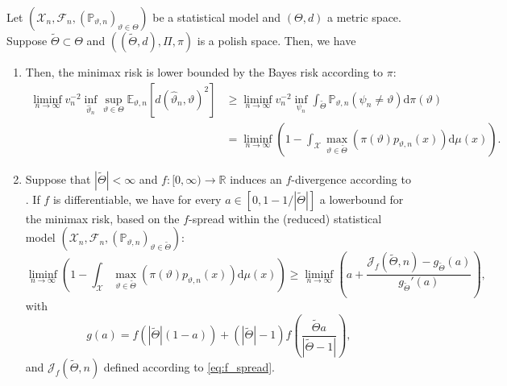 \documentclass[a4paper]{article}
\begin{document}
\begin{proposition}
	Let $(\mathcal{X}_n, \mathcal{F}_n, (\mathbb{P}_{\vartheta,n})_{\vartheta \in \Theta})$ be a statistical model and $(\Theta,d)$ a metric space. Suppose $\tilde{\Theta}\subset \Theta$ and $((\tilde{\Theta},d), \Pi, \pi)$ is a polish space. Then, we have
	\begin{enumerate}
		\item Then, the minimax risk is lower bounded by the Bayes risk according to $\pi$:
		      \begin{equation*}
			      \begin{aligned}
				      \liminf_{n \rightarrow \infty} v_n^{-2} \inf_{\hat{\vartheta}_n} \sup_{\vartheta \in \Theta} \mathbb{E}_{\vartheta,n}[d(\hat{\vartheta}_{n}, \vartheta)^{2}] & \geq \liminf_{n \rightarrow \infty} v_n^{-2} \inf_{\psi_n} \int_{\tilde{\Theta}} \mathbb{P}_{\vartheta, n}(\psi_n \neq \vartheta) \mathrm{d}\pi(\vartheta) \\
				                                                                                                                                                                   & =\liminf_{n \rightarrow \infty} \left(1-\int_{\mathcal{X}}\max_{\vartheta \in \tilde{\Theta}} (\pi(\vartheta)p_{\vartheta, n}(x))\mathrm{d}\mu(x) \right).
			      \end{aligned}
		      \end{equation*}
		\item Suppose that $|\tilde{\Theta}|< \infty$  and $f:[0,\infty) \rightarrow \mathbb{R}$ induces an $f$-divergence according to . If $f$ is differentiable, we have for every $a \in [0, 1- 1/|\tilde{\Theta}|]$ a lowerbound for the minimax risk, based on the $f$-spread within the (reduced) statistical model $(\mathcal{X}_n, \mathcal{F}_n, (\mathbb{P}_{\vartheta,n})_{\vartheta \in \tilde{\Theta}})$:
		      \begin{equation*}
			      \liminf_{n \rightarrow \infty} \left(1-\int_{\mathcal{X}}\max_{\vartheta \in \tilde{\Theta}} (\pi(\vartheta)p_{\vartheta, n}(x))\mathrm{d}\mu(x) \right) \geq \liminf_{n \rightarrow \infty} \left(a + \frac{\mathcal{J}_f(\tilde{\Theta},n)-g_{\tilde{\Theta}}(a)}{g_{\tilde{\Theta}}'(a)}\right),
		      \end{equation*}
		      with
		      \begin{equation*}
			      g(a)=f(|\tilde{\Theta}|(1-a))+ (|\tilde{\Theta}|-1)f\left(\frac{\tilde{\Theta}a}{|\tilde{\Theta}-1|}\right),
		      \end{equation*}
		      and $\mathcal{J}_f(\tilde{\Theta},n)$ defined according to \eqref{eq:f_spread}.
	\end{enumerate}
\end{proposition}
\end{document}
